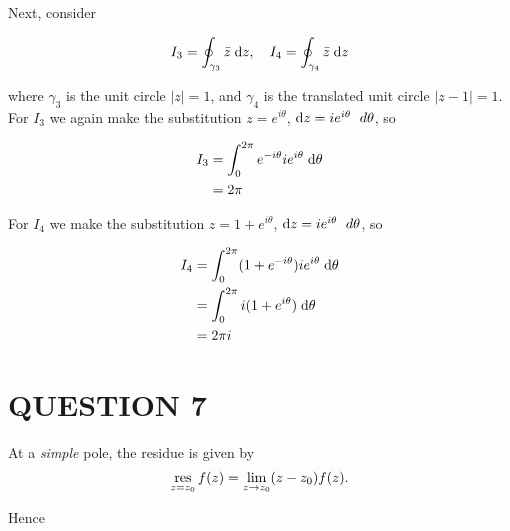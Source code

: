 \documentclass[a4paper]{article}
\begin{document}
Next, consider 

\[ I_{3} = \oint_{\gamma_{3}} \bar{z} \; \mathrm{d} z, \quad I_{4} = \oint_{\gamma_{4}} \bar{z} \; \mathrm{d} z\]

where $ \gamma_{3} $ is the unit circle $ | z | = 1 $, and $ \gamma_{4} $ is the translated unit circle $ | z - 1 | = 1 $. For $ I_{3} $ we again make the substitution $ z = e^{i \theta} $, $ \mathrm{d} z = i e^{i \theta} \; \ d \theta $, so 

\begin{align*}
I_{3} & = \int_{0}^{2\pi} e^{-i \theta} i e^{i \theta} \; \mathrm{d} \theta \\
& = 2 \pi
\end{align*}

For $ I_{4} $ we make the substitution $ z = 1 + e^{i \theta} $, $ \mathrm{d} z = i e^{i \theta} \; \ d \theta $, so 

\begin{align*}
I_{4} & = \int_{0}^{2\pi} (1 + e^{-i \theta}) i e^{i \theta} \; \mathrm{d} \theta \\
& = \int_{0}^{2\pi} i( 1 + e^{i \theta}) \; \mathrm{d} \theta \\
& = 2 \pi i
\end{align*}



\section{QUESTION 7}

 At a \emph{simple} pole, the residue is given by
\[
\operatorname*{res}_{z = z_0}f(z) = \lim_{z \to z_0} (z - z_0) f(z).
\]

Hence 
\end{document}
